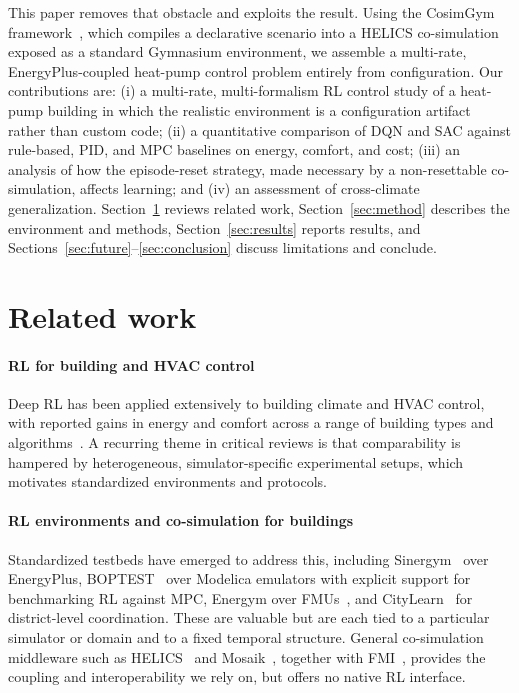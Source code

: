 \documentclass[preprint,review,12pt]{elsarticle}
\begin{document}
This paper removes that obstacle and exploits the result. Using the CosimGym
framework~\cite{cosimgym_paperA}, which compiles a declarative scenario into a
HELICS co-simulation exposed as a standard Gymnasium environment, we assemble a
multi-rate, EnergyPlus-coupled heat-pump control problem entirely from
configuration. Our contributions are: (i) a multi-rate, multi-formalism RL control
study of a heat-pump building in which the realistic environment is a configuration
artifact rather than custom code; (ii) a quantitative comparison of DQN and SAC
against rule-based, PID, and MPC baselines on energy, comfort, and cost; (iii) an
analysis of how the episode-reset strategy, made necessary by a non-resettable
co-simulation, affects learning; and (iv) an assessment of cross-climate
generalization. Section~\ref{sec:related} reviews related work,
Section~\ref{sec:method} describes the environment and methods,
Section~\ref{sec:results} reports results, and
Sections~\ref{sec:future}--\ref{sec:conclusion} discuss limitations and conclude.

\section{Related work}\label{sec:related}
\paragraph{RL for building and HVAC control}
Deep RL has been applied extensively to building climate and HVAC control, with
reported gains in energy and comfort across a range of building types and
algorithms~\cite{drl_hvac_review}. A recurring theme in critical reviews is that
comparability is hampered by heterogeneous, simulator-specific experimental setups,
which motivates standardized environments and protocols.

\paragraph{RL environments and co-simulation for buildings}
Standardized testbeds have emerged to address this, including
Sinergym~\cite{sinergym} over EnergyPlus, BOPTEST~\cite{boptest} over Modelica
emulators with explicit support for benchmarking RL against MPC, Energym over
FMUs~\cite{energym}, and CityLearn~\cite{citylearn} for district-level
coordination. These are valuable but are each tied to a particular simulator or
domain and to a fixed temporal structure. General co-simulation middleware such as
HELICS~\cite{helics} and Mosaik~\cite{mosaik}, together with FMI~\cite{fmi},
provides the coupling and interoperability we rely on, but offers no native RL
interface.
\end{document}
